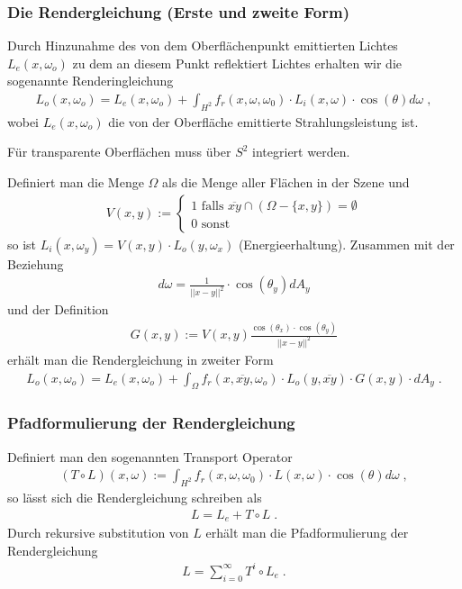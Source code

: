  
\subsubsection{Die Rendergleichung (Erste und zweite Form)}

Durch Hinzunahme des von dem Oberflächenpunkt emittierten Lichtes $L_e(x, \omega_o)$ zu dem   an diesem Punkt reflektiert Lichtes erhalten wir die sogenannte Renderingleichung 
\begin{align}
L_o(x, \omega_o) = L_e(x, \omega_o)  + \displaystyle \int_{H^2}f_r (x, \omega, \omega_0) \cdot L_i(x, \omega)  \cdot  \cos(\theta) d\omega \; ,
\end{align}
wobei $L_e(x, \omega_o)$ die von der Oberfläche emittierte Strahlungsleistung ist. 

\begin{Bemerkung}
Für transparente Oberflächen muss über $S^2$ integriert werden.
\end{Bemerkung}
Definiert man die Menge $\Omega$  als die Menge aller Flächen  in der Szene und
\begin{align}
V(x,y) := \begin{cases}
1 \text{ falls } \overline{xy} \cap (\Omega -\{x,y\}) = \emptyset \\
0 \text{ sonst }
\end{cases}
\end{align}
so ist $L_i(x, \omega_y) = V(x,y) \cdot L_o(y, \omega_x)$ (Energieerhaltung).
Zusammen mit der Beziehung 
\begin{align}
d\omega =  \frac{1}{||x -y||^2} \cdot  \cos(\theta_y) dA_y
\end{align}
 und der Definition 
\begin{align}
G(x,y) := V(x,y)  \frac{ \cos(\theta_x) \cdot  \cos(\theta_y)}{||x -y||^2} 
\end{align}
erhält man die Rendergleichung in zweiter Form 
\begin{align}
L_o(x, \omega_o) = L_e(x, \omega_o)  + \displaystyle \int_{\Omega} f_r (x, \overline{xy}, \omega_o) \cdot   L_o(y, \overline{xy})  \cdot  G(x,y) \cdot   dA_y \; .
\end{align} 

\subsubsection{Pfadformulierung der Rendergleichung}
Definiert man den sogenannten Transport  Operator
\begin{align}
(T \circ  L)(x, \omega) :=  \displaystyle \int_{H^2}f_r (x, \omega, \omega_0) \cdot L(x, \omega)  \cdot  \cos(\theta) d\omega \; ,
\end{align}
so lässt sich die Rendergleichung schreiben als
\begin{align}
L = L_e + T \circ L \; .
\end{align}
Durch rekursive substitution von $L$ erhält man die  Pfadformulierung der Rendergleichung
\begin{align}
L = \sum_{i= 0}^{\infty} T^i \circ L_e \; .
\end{align}

